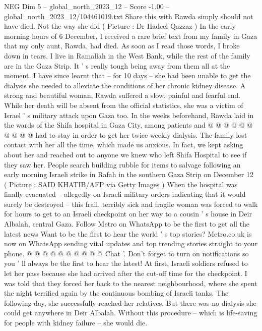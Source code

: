 \begin{textsample}{NEG Dim 5 – global\_north\_2023\_12 – Score -1.00 – global\_north\_2023\_12/104461019.txt}  \label{ex:f5_neg_110}
Share this with Rawda simply should not have died.
Not the way she did ( Picture : Dr Hadeel Qazzaz ) In the early morning hours of 6 December, I received a rare brief text from my family in Gaza that my only aunt, Rawda, had died.
As soon as I read those words, I broke down in tears.
I live in Ramallah in the West Bank, while the rest of the family are in the Gaza Strip.
It ' s really tough being away from them all at the moment.
I have since learnt that -- for 10 days -- she had been unable to get the dialysis she needed to alleviate the conditions of her chronic kidney disease.
A strong and beautiful woman, Rawda suffered a slow, painful and fearful end.
While her death will be absent from the official statistics, she was a victim of Israel ' s military attack upon Gaza too.
In the weeks beforehand, Rawda laid in the wards of the Shifa hospital in Gaza City, among patients and @ @ @ @ @ @ @ @ @ @ had to stay in order to get her twice weekly dialysis.
The family lost contact with her all the time, which made us anxious.
In fact, we kept asking about her and reached out to anyone we knew who left Shifa Hospital to see if they saw her.
People search building rubble for items to salvage following an early morning Israeli strike in Rafah in the southern Gaza Strip on December 12 ( Picture : SAID KHATIB/AFP via Getty Images ) When the hospital was finally evacuated -- allegedly on Israeli military orders indicating that it would surely be destroyed -- this frail, terribly sick and fragile woman was forced to walk for hours to get to an Israeli checkpoint on her way to a cousin ' s house in Deir Albalah, central Gaza.
Follow Metro on WhatsApp to be the first to get all the latest news Want to be the first to hear the world ' s top stories?
Metro.co.uk is now on WhatsApp sending vital updates and top trending stories straight to your phone. @ @ @ @ @ @ @ @ @ @ Chat '.
Don't forget to turn on notifications so you ' ll always be the first to hear the latest!
At first, Israeli soldiers refused to let her pass because she had arrived after the cut-off time for the checkpoint.
I was told that they forced her back to the nearest neighbourhood, where she spent the night terrified again by the continuous bombing of Israeli tanks.
The following day, she successfully reached her relatives.
But there was no dialysis she could get anywhere in Deir Albalah.
Without this procedure -- which is life-saving for people with kidney failure -- she would die.

\end{textsample}
